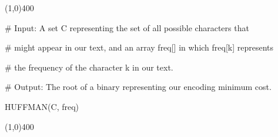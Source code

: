 \vspace{1em}
\begin{center}
\line(1,0){400}
\end{center}

\begin{allintypewriter}
\# Input: A set C representing the set of all possible characters that 

\# might appear in our text, and an array freq[] in which freq[k] represents 

\# the frequency of the character k in our text.

\# Output: The root of a binary representing our encoding minimum cost.

\hspace{0cm}

HUFFMAN(C, freq) 

\begin{center}
\line(1,0){400}
\end{center}
\end{allintypewriter}

